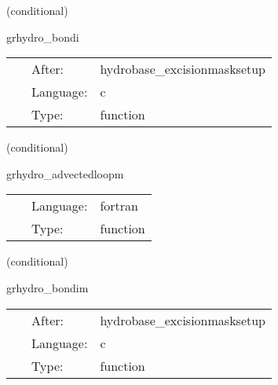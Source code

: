 \documentclass{article}
\begin{document}
\vspace{5mm}

   (conditional) 

\hspace{5mm} grhydro\_bondi 

\hspace{5mm}{\it setup grhydro vars for the hydrodynamic bondi solution } 


\hspace{5mm}

 \begin{tabular*}{160mm}{cll} 
~ & After:  & hydrobase\_excisionmasksetup \\ 
~ & Language:  & c \\ 
~ & Type:  & function \\ 
\end{tabular*} 


\vspace{5mm}

   (conditional) 

\hspace{5mm} grhydro\_advectedloopm 

\hspace{5mm}{\it mhd advected loop initial data } 


\hspace{5mm}

 \begin{tabular*}{160mm}{cll} 
~ & Language:  & fortran \\ 
~ & Type:  & function \\ 
\end{tabular*} 


\vspace{5mm}

   (conditional) 

\hspace{5mm} grhydro\_bondim 

\hspace{5mm}{\it setup grhydro vars for the magnetized bondi solution } 


\hspace{5mm}

 \begin{tabular*}{160mm}{cll} 
~ & After:  & hydrobase\_excisionmasksetup \\ 
~ & Language:  & c \\ 
~ & Type:  & function \\ 
\end{tabular*} 
\end{document}
